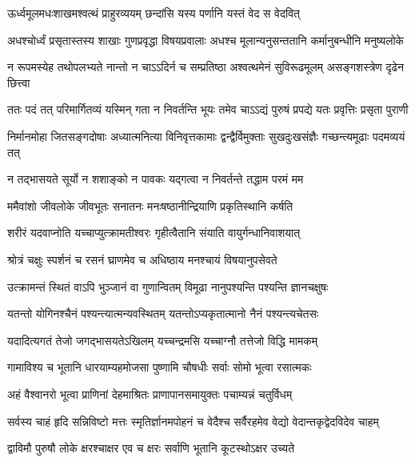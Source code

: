 \twolineshloka
{ऊर्ध्वमूलमधःशाखमश्वत्थं प्राहुरव्ययम्}
{छन्दांसि यस्य पर्णानि यस्तं वेद स वेदवित्}%

\fourlineindentedshloka
{अधश्चोर्ध्वं प्रसृतास्तस्य शाखाः}
{गुणप्रवृद्धा विषयप्रवालाः}
{अधश्च मूलान्यनुसन्ततानि}
{कर्मानुबन्धीनि मनुष्यलोके}%

\fourlineindentedshloka
{न रूपमस्येह तथोपलभ्यते}
{नान्तो न चाऽऽदिर्न च सम्प्रतिष्ठा}
{अश्वत्थमेनं सुविरूढमूलम्}
{असङ्गशस्त्रेण दृढेन छित्त्वा}%

\fourlineindentedshloka
{ततः पदं तत् परिमार्गितव्यं}
{यस्मिन् गता न निवर्तन्ति भूयः}
{तमेव चाऽऽद्यं पुरुषं प्रपद्ये}
{यतः प्रवृत्तिः प्रसृता पुराणी}%

\fourlineindentedshloka
{निर्मानमोहा जितसङ्गदोषाः}
{अध्यात्मनित्या विनिवृत्तकामाः}
{द्वन्द्वैर्विमुक्ताः सुखदुःखसंज्ञैः}
{गच्छन्त्यमूढाः पदमव्ययं तत्}%

\twolineshloka
{न तद्भासयते सूर्यो न शशाङ्को न पावकः}
{यद्गत्वा न निवर्तन्ते तद्धाम परमं मम}%

\twolineshloka
{ममैवांशो जीवलोके जीवभूतः सनातनः}
{मनःषष्ठानीन्द्रियाणि प्रकृतिस्थानि कर्षति}%

\twolineshloka
{शरीरं यदवाप्नोति यच्चाप्युत्क्रामतीश्वरः}
{गृहीत्वैतानि संयाति वायुर्गन्धानिवाशयात्}%

\twolineshloka
{श्रोत्रं चक्षुः स्पर्शनं च रसनं घ्राणमेव च}
{अधिष्ठाय मनश्चायं विषयानुपसेवते}%

\twolineshloka
{उत्क्रामन्तं स्थितं वाऽपि भुञ्जानं वा गुणान्वितम्}
{विमूढा नानुपश्यन्ति पश्यन्ति ज्ञानचक्षुषः}%

\twolineshloka
{यतन्तो योगिनश्चैनं पश्यन्त्यात्मन्यवस्थितम्}
{यतन्तोऽप्यकृतात्मानो नैनं पश्यन्त्यचेतसः}%

\twolineshloka
{यदादित्यगतं तेजो जगद्भासयतेऽखिलम्}
{यच्चन्द्रमसि यच्चाग्नौ तत्तेजो विद्धि मामकम्}%

\twolineshloka
{गामाविश्य च भूतानि धारयाम्यहमोजसा}
{पुष्णामि चौषधीः सर्वाः सोमो भूत्वा रसात्मकः}%

\twolineshloka
{अहं वैश्वानरो भूत्वा प्राणिनां देहमाश्रितः}
{प्राणापानसमायुक्तः पचाम्यन्नं चतुर्विधम्}%

\fourlineindentedshloka
{सर्वस्य चाहं हृदि सन्निविष्टो}
{मत्तः स्मृतिर्ज्ञानमपोहनं च}
{वेदैश्च सर्वैरहमेव वेद्यो}
{वेदान्तकृद्वेदविदेव चाहम्}%

\twolineshloka
{द्वाविमौ पुरुषौ लोके क्षरश्चाक्षर एव च}
{क्षरः सर्वाणि भूतानि कूटस्थोऽक्षर उच्यते}%

